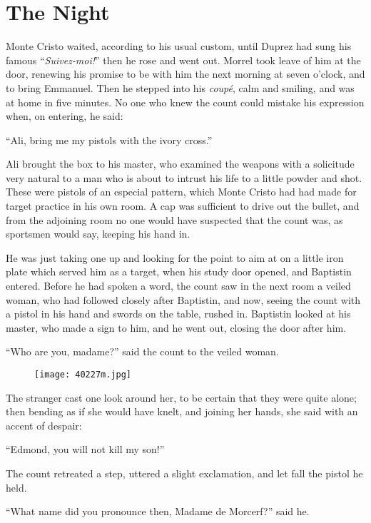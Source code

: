 \chapter{The Night}

Monte Cristo waited, according to his usual custom, until Duprez had
sung his famous “\textit{Suivez-moi!}” then he rose and went out. Morrel took
leave of him at the door, renewing his promise to be with him the next
morning at seven o’clock, and to bring Emmanuel. Then he stepped into
his \textit{coupé}, calm and smiling, and was at home in five minutes. No one
who knew the count could mistake his expression when, on entering, he
said:

“Ali, bring me my pistols with the ivory cross.”

Ali brought the box to his master, who examined the weapons with a
solicitude very natural to a man who is about to intrust his life to a
little powder and shot. These were pistols of an especial pattern,
which Monte Cristo had had made for target practice in his own room. A
cap was sufficient to drive out the bullet, and from the adjoining room
no one would have suspected that the count was, as sportsmen would say,
keeping his hand in.

He was just taking one up and looking for the point to aim at on a
little iron plate which served him as a target, when his study door
opened, and Baptistin entered. Before he had spoken a word, the count
saw in the next room a veiled woman, who had followed closely after
Baptistin, and now, seeing the count with a pistol in his hand and
swords on the table, rushed in. Baptistin looked at his master, who
made a sign to him, and he went out, closing the door after him.

“Who are you, madame?” said the count to the veiled woman.

\begin{figure}[ht]
\texttt{[image: 40227m.jpg]}
\end{figure}

The stranger cast one look around her, to be certain that they were
quite alone; then bending as if she would have knelt, and joining her
hands, she said with an accent of despair:

“Edmond, you will not kill my son!”

The count retreated a step, uttered a slight exclamation, and let fall
the pistol he held.

“What name did you pronounce then, Madame de Morcerf?” said he.

